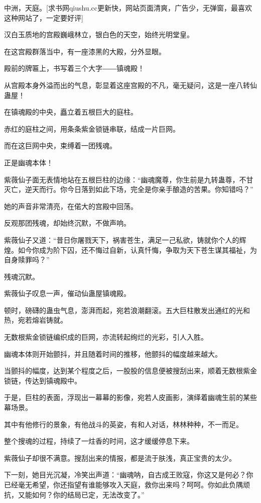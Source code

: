 
\begin{this_body}

中洲，天庭。[求书网qiushu.cc更新快，网站页面清爽，广告少，无弹窗，最喜欢这种网站了，一定要好评]

汉白玉质地的宫殿巍峨林立，银白色的天空，始终光明堂皇。

在这宫殿群落当中，有一座漆黑的大殿，分外显眼。

殿前的牌匾上，书写着三个大字――镇魂殿！

从宫殿本身外溢而出的气息，彰显着这座宫殿的不凡，毫无疑问，这是一座八转仙蛊屋！

在镇魂殿的中央，矗立着五根巨大的庭柱。

赤红的庭柱之间，用条条紫金锁链串联，结成一片巨网。

而在这巨网中央，束缚着一团残魂。

正是幽魂本体！

紫薇仙子面无表情地站在五根巨柱的边缘：“幽魂魔尊，你生前是九转蛊尊，不甘灭亡，逆天而行。你今日落到如此下场，完全是你亲手酿造的苦果。你知错吗？”

她的声音非常清亮，在偌大的宫殿中回荡。

反观那团残魂，却始终沉默，不做声响。

紫薇仙子又道：“昔日你屠戮天下，祸害苍生，满足一己私欲，铸就你个人的辉煌。如今你成为阶下囚，还不悔过自新，认真忏悔，争取为天下苍生谋其福祉，为自身赎罪吗？”

残魂沉默。

紫薇仙子叹息一声，催动仙蛊屋镇魂殿。

顿时，磅礴的蛊虫气息，澎湃而起，宛若浪潮翻滚。五大巨柱散发出通红的光和热，宛若熔岩铸就。

无数根紫金锁链编织成的巨网，亦流转起绚烂的光彩，引人入胜。

幽魂本体则开始颤抖，并且随着时间的推移，他颤抖的幅度越来越大。

当颤抖的幅度，达到某个程度之后，一股股的信息便被搜刮出来，顺着无数根紫金锁链，传达到镇魂殿中。

于是，巨柱的表面，浮现出一幕幕的影像，宛若人皮画影，演绎着幽魂生前的某些幕场景。

其中有他修行的景象，有他战斗的英姿，有和人对话，林林种种，不一而足。

整个搜魂的过程，持续了一炷香的时间，这才缓缓停息下来。

紫薇仙子却很不满意。搜刮出来的情报，都是流于肤浅，真正宝贵的太少。

下一刻，她目光沉凝，冷笑出声道：“幽魂呐，自古成王败寇，你这又是何必？你已经毫无希望，你还指望有谁能够攻入天庭，救你出来吗？呵呵。你如此负隅顽抗，又能如何？你的结局已定，无法改变了。”


\end{this_body}
